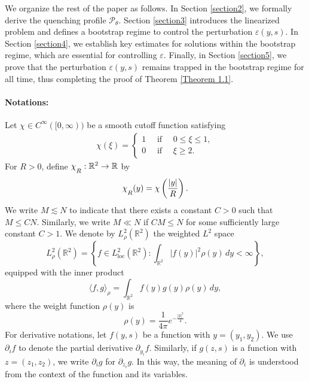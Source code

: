 \documentclass[11pt,reqno]{amsart}
\theoremstyle{definition}
\theoremstyle{bfremark}
\numberwithin{equation}{section}
\newcommand{\mchi}{\raisebox{0pt}[1ex][1ex]{$\chi$}}
\begin{document}
We organize the rest of the paper as follows. In Section \ref{section2}, we formally derive the quenching profile \(\mathcal{P}_{\theta}\). Section \ref{section3} introduces the linearized problem and defines a bootstrap regime to control the perturbation \(\varepsilon(y,s)\). In Section \ref{section4}, we establish key estimates for solutions within the bootstrap regime, which are essential for controlling \(\varepsilon\). Finally, in Section \ref{section5}, we prove that the perturbation \(\varepsilon(y,s)\) remains trapped in the bootstrap regime for all time, thus completing the proof of Theorem \ref{Theorem 1.1}.

\vspace{10pt}

\paragraph{\textbf{Notations:}} Let \(\chi\in C^{\infty}([0,\infty))\) be a smooth cutoff function satisfying
\begin{align*}
    \chi(\xi)=\begin{cases}
            1 \quad \text{ if } \quad 0 \leq\xi \leq 1,\\
            0 \quad \text{ if } \quad \xi \geq 2. 
        \end{cases}
\end{align*}
For \(R > 0\), define \(\mchi_R : \mathbb{R}^2 \to \mathbb{R}\) by
\begin{equation}\label{def:chiR}
    \mchi_R(y) = \chi\left(\frac{|y|}{R}\right).
\end{equation}
We write \( M \lesssim N \) to indicate that there exists a constant \( C > 0 \) such that \( M \leq C N \). Similarly, we write \( M \ll N \) if \( C M \leq N \) for some sufficiently large constant \( C > 1 \).
We denote by \(L^2_{\rho}(\mathbb{R}^2)\) the weighted \(L^2\) space 
\[
L^2_{\rho}(\mathbb{R}^2) = \left\{ f \in L^2_{\text{loc}}(\mathbb{R}^2) : \int_{\mathbb{R}^2} |f(y)|^2 \rho(y)\,dy < \infty \right\},
\]
equipped with the inner product
\begin{equation}\label{def:L2rho}
    \langle f, g \rangle_{\rho} = \int_{\mathbb{R}^2} f(y) g(y) \rho(y)\,dy,
\end{equation}
where the weight function \(\rho(y)\) is 
\[
\rho(y) = \frac{1}{4\pi} e^{-\frac{|y|^2}{4}}.
\]
For derivative notations, let \(f(y,s)\) be a function with \(y=(y_1,y_2)\). We use \(\partial_if\) to denote the partial derivative \(\partial_{y_i}f\). Similarly, if \(g(z,s)\) is a function with \(z=(z_1,z_2)\), we write \(\partial_ig\) for \(\partial_{z_i}g\). In this way, the meaning of \(\partial_i\) is understood from the context of the function and its variables.
\end{document}
